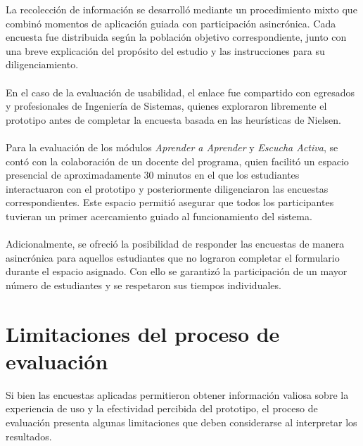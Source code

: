 La recolección de información se desarrolló mediante un procedimiento mixto que combinó momentos de aplicación guiada con participación asincrónica. Cada encuesta fue distribuida según la población objetivo correspondiente, junto con una breve explicación del propósito del estudio y las instrucciones para su diligenciamiento.
\\
\\
En el caso de la evaluación de usabilidad, el enlace fue compartido con egresados y profesionales de Ingeniería de Sistemas, quienes exploraron libremente el prototipo antes de completar la encuesta basada en las heurísticas de Nielsen.
\\
\\
Para la evaluación de los módulos \textit{Aprender a Aprender} y \textit{Escucha Activa}, se contó con la colaboración de un docente del programa, quien facilitó un espacio presencial de aproximadamente 30 minutos en el que los estudiantes interactuaron con el prototipo y posteriormente diligenciaron las encuestas correspondientes. Este espacio permitió asegurar que todos los participantes tuvieran un primer acercamiento guiado al funcionamiento del sistema.
\\
\\
Adicionalmente, se ofreció la posibilidad de responder las encuestas de manera asincrónica para aquellos estudiantes que no lograron completar el formulario durante el espacio asignado. Con ello se garantizó la participación de un mayor número de estudiantes y se respetaron sus tiempos individuales.


\section{Limitaciones del proceso de evaluación}

Si bien las encuestas aplicadas permitieron obtener información valiosa sobre la experiencia de uso y la efectividad percibida del prototipo, el proceso de evaluación presenta algunas limitaciones que deben considerarse al interpretar los resultados.

